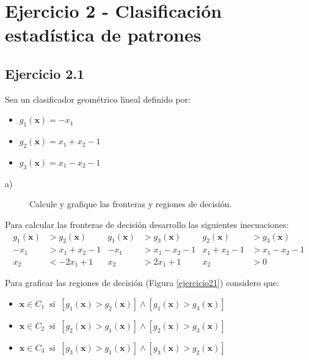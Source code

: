 \documentclass[11pt,a4paper,final]{article}
\begin{document}
\section{Ejercicio 2 - Clasificación estadística de patrones}

\subsection{Ejercicio 2.1}

Sea un clasificador geométrico lineal definido por:
\begin{itemize}
\item $g_1(\mathbf{x}) = - x_1$ 
\item $g_2(\mathbf{x}) = x_1 + x_2 - 1$
\item $g_3(\mathbf{x}) = x_1 - x_2 - 1$
\end{itemize}

\begin{description}
\item[a)] Calcule y grafique las fronteras y regiones de decisión.
\end{description}

Para calcular las fronteras de decisión desarrollo las siguientes inecuaciones:
\begin{align*}
g_1(\mathbf{x}) &> g_2(\mathbf{x})   &  g_1(\mathbf{x}) &> g_3(\mathbf{x})  &  g_2(\mathbf{x}) &> g_3(\mathbf{x}) \\
- x_1           &> x_1 + x_2 - 1     &  - x_1           &> x_1 - x_2 - 1    &  x_1 + x_2 - 1   &> x_1 - x_2 - 1   \\
  x_2           &< - 2 x_1 + 1       &  x_2             &> 2 x_1 + 1        &  x_2             &> 0
\end{align*}

Para graficar las regiones de decisión (Figura \ref{ejercicio21}) considero que:
\begin{itemize}
\item $\mathbf{x} \in C_1 \;\; \mathrm{si} \;\; [g_1(\mathbf{x}) > g_2(\mathbf{x})] \wedge  [g_1(\mathbf{x}) > g_3(\mathbf{x})]$

\item $\mathbf{x} \in C_2 \;\; \mathrm{si} \;\; [g_2(\mathbf{x}) > g_1(\mathbf{x})] \wedge  [g_2(\mathbf{x}) > g_3(\mathbf{x})]$

\item $\mathbf{x} \in C_3 \;\; \mathrm{si} \;\; [g_3(\mathbf{x}) > g_1(\mathbf{x})] \wedge  [g_3(\mathbf{x}) > g_2(\mathbf{x})]$
\end{itemize}
\end{document}

